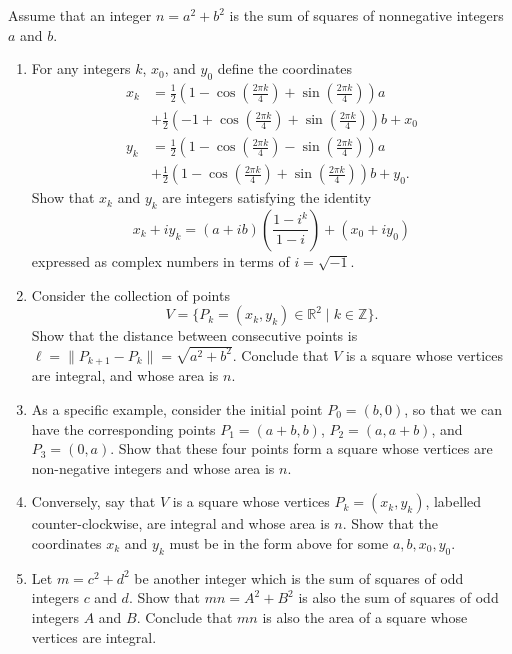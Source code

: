 \documentclass[12 pt, letterpaper]{hmcpset}
\begin{document}
\begin{problem}[3]
	Assume that an integer $n = a^{2} + b^{2}$ is the sum of squares of nonnegative integers $a$ and $b$.
	\begin{enumerate}
		\item For any integers $k$, $x_{0}$, and  $y_{0}$ define the coordinates
			\[
				\begin{split}
					x_{k} & = \frac{1}{2} \left ( 1 - \cos{\left ( \frac{2 \pi k}{4} \right ) + \sin{\left ( \frac{2 \pi k}{4} \right )}} \right ) a \\
					      & + \frac{1}{2} \left ( -1 + \cos{\left ( \frac{2 \pi k}{4} \right ) + \sin{\left ( \frac{2 \pi k}{4} \right )}} \right ) b + x_{0} \\
					y_{k} & = \frac{1}{2} \left ( 1 - \cos{\left ( \frac{2 \pi k}{4} \right ) - \sin{\left ( \frac{2 \pi k}{4} \right )}} \right ) a \\
					      & + \frac{1}{2} \left (1 - \cos{\left ( \frac{2 \pi k}{4} \right ) + \sin{\left ( \frac{2 \pi k}{4} \right )}} \right ) b + y_{0}.
				\end{split}
			\]
			Show that $x_{k}$ and $y_{k}$ are integers satisfying the identity
			\[
				x_{k} + i y_{k} = (a + i b) \left ( \frac{1 - i^{k}}{1 - i} \right ) + (x_{0} + i y_{0})
			\]
			expressed as complex numbers in terms of $i = \sqrt{-1}$.
		\item Consider the collection of points
			\[
				V = \{ P_{k} = (x_{k}, y_{k}) \in \mathbb{R}^{2} \mid k \in \mathbb{Z} \}.
			\]
			Show that the distance between consecutive points is $\ell = \lVert P_{k + 1} - P_{k} \rVert = \sqrt{a^{2} + b^{2}}$. Conclude that $V$ is a square whose vertices are integral, and whose area is $n$.
		\item As a specific example, consider the initial point $P_{0} = (b, 0)$, so that we can have the corresponding points $P_{1} = (a + b, b)$, $P_{2} = (a, a + b)$, and $P_{3} = (0, a)$. Show that these four points form a square whose vertices are non-negative integers and whose area is $n$.
		\item Conversely, say that $V$ is a square whose vertices $P_{k} = (x_{k}, y_{k})$, labelled counter-clockwise, are integral and whose area is $n$. Show that the coordinates $x_{k}$ and $y_{k}$ must be in the form above for some $a, b, x_{0}, y_{0}$.
		\item Let $m = c^{2} + d^{2}$ be another integer which is the sum of squares of odd integers $c$ and $d$. Show that $mn = A^{2} + B^{2}$ is also the sum of squares of odd integers $A$ and $B$. Conclude that $mn$ is also the area of a square whose vertices are integral.
	\end{enumerate}
\end{problem}
\end{document}
